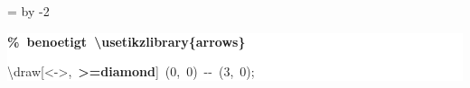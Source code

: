 \begingroup
\ttfamily
{}
=\textwidth
\advance{} by -2\fboxsep
\noindent
\colorbox{background}
{%
\parbox{\dimen255}
{%
\rule[-0.5ex]{0pt}{2.5ex}\hspace*{0.0em}\textcolor{G}{\textbf{\%~benoetigt~\textbackslash{}usetikzlibrary\{arrows\}}}\\
\rule[-0.5ex]{0pt}{2.5ex}\hspace*{0.0em}\textbackslash{}draw[{<}{-}{>},~\textcolor{R}{\textbf{{>}=diamond}}]~(0,~0)~{-}{-}~(3,~0);}%
}%
\endgroup
